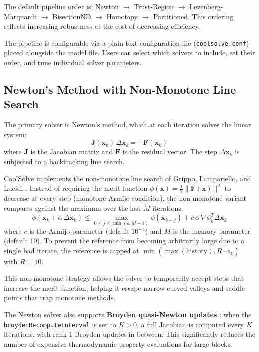 \documentclass[review,3p]{elsarticle}
\begin{document}
The default pipeline order is: Newton $\rightarrow$ Trust-Region $\rightarrow$ Levenberg-Marquardt $\rightarrow$ BisectionND $\rightarrow$ Homotopy $\rightarrow$ Partitioned. This ordering reflects increasing robustness at the cost of decreasing efficiency.

The pipeline is configurable via a plain-text configuration file (\texttt{coolsolve.conf}) placed alongside the model file. Users can select which solvers to include, set their order, and tune individual solver parameters.

\subsection{Newton's Method with Non-Monotone Line Search}

The primary solver is Newton's method, which at each iteration solves the linear system:
\begin{equation}
    \mathbf{J}(\mathbf{x}_k) \, \Delta\mathbf{x}_k = -\mathbf{F}(\mathbf{x}_k)
\end{equation}
where $\mathbf{J}$ is the Jacobian matrix and $\mathbf{F}$ is the residual vector. The step $\Delta\mathbf{x}_k$ is subjected to a backtracking line search.

CoolSolve implements the non-monotone line search of Grippo, Lampariello, and Lucidi \cite{Grippo1986}. Instead of requiring the merit function $\phi(\mathbf{x}) = \frac{1}{2}\|\mathbf{F}(\mathbf{x})\|^2$ to decrease at every step (monotone Armijo condition), the non-monotone variant compares against the maximum over the last $M$ iterations:
\begin{equation}
    \phi(\mathbf{x}_k + \alpha \, \Delta\mathbf{x}_k) \leq \max_{0 \leq j \leq \min(k,M-1)} \phi(\mathbf{x}_{k-j}) + c \, \alpha \, \nabla\phi_k^T \Delta\mathbf{x}_k
    \label{eq:nonmonotone}
\end{equation}
where $c$ is the Armijo parameter (default $10^{-4}$) and $M$ is the memory parameter (default 10). To prevent the reference from becoming arbitrarily large due to a single bad iterate, the reference is capped at $\min(\max(\text{history}), R \cdot \phi_k)$ with $R=10$.

This non-monotone strategy allows the solver to temporarily accept steps that increase the merit function, helping it escape narrow curved valleys and saddle points that trap monotone methods.

The Newton solver also supports \textbf{Broyden quasi-Newton updates} \cite{Broyden1965}: when the \texttt{broydenRecomputeInterval} is set to $K > 0$, a full Jacobian is computed every $K$ iterations, with rank-1 Broyden updates in between. This significantly reduces the number of expensive thermodynamic property evaluations for large blocks.
\end{document}
